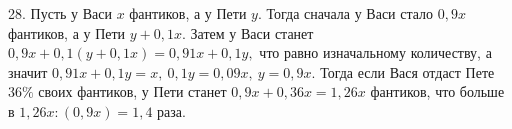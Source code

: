 28. Пусть у Васи $x$ фантиков, а у Пети $y.$ Тогда сначала у Васи стало $0,9x$ фантиков, а у Пети $y+0,1x.$ Затем у Васи станет $0,9x+0,1(y+0,1x)=0,91x+0,1y,$ что равно изначальному количеству, а значит $0,91x+0,1y=x,\ 0,1y=0,09x,\ y=0,9x.$ Тогда если Вася отдаст Пете $36\%$ своих фантиков, у Пети станет $0,9x+0,36x=1,26x$ фантиков, что больше в $1,26x:(0,9x)=1,4$ раза.\\
